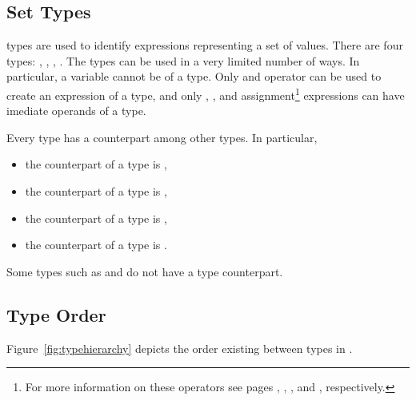 \subsection{Set Types}
\label{Set Types}

\Set types are used to identify expressions representing a set of values.
There are four \Set types: \BoolSet, \IntSet, \SymbSet, \IntSymbSet.
The \Set types can be used in a very limited number of ways. In
particular, a variable cannot be of a \Set type. Only  and  operator can be used to create an
expression of a \Set type, and only
, , \itebullet and assignment\footnote{For more information
on these operators see pages \pageref{Range Constant},
\pageref{Set Expressions},
\pageref{Inclusion Operator}, \pageref{Case Expressions} and 
\pageref{ASSIGN Constraint}, respectively.} expressions can have imediate operands of a \Set
type.

Every \Set type has a counterpart among other types. In particular,
\begin{itemize}
\item[] the counterpart of a \BoolSet type is \Boolean, 
\item[] the counterpart of a \IntSet type is \Integer, 
\item[] the counterpart of a \SymbSet type is \SymbEnum, 
\item[] the counterpart of a \IntSymbSet type is \IntSymbEnum. 
\end{itemize}
Some types such as \UWord and \SWord %
do not have a \Set type counterpart.


\subsection{Type Order}
\label{Type Order}
%
Figure~\ref{fig:typehierarchy} depicts the order existing between
types in \nusmv.

